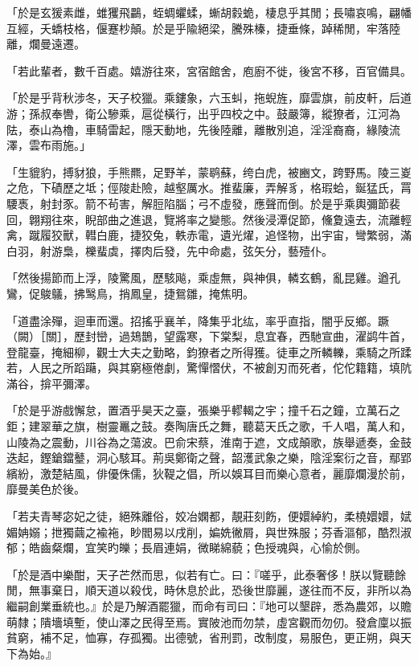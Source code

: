 \begin{pinyinscope}
「於是玄猨素雌，蜼玃飛鸓，蛭蜩蠷蝚，螹胡豰蛫，棲息乎其閒；長嘯哀鳴，翩幡互經，夭蟜枝格，偃蹇杪顛。於是乎隃絕梁，騰殊榛，捷垂條，踔稀閒，牢落陸離，爛曼遠遷。

「若此輩者，數千百處。嬉游往來，宮宿館舍，庖廚不徙，後宮不移，百官備具。

「於是乎背秋涉冬，天子校獵。乘鏤象，六玉虯，拖蜺旌，靡雲旗，前皮軒，后道游；孫叔奉轡，衛公驂乘，扈從橫行，出乎四校之中。鼓嚴簿，縱獠者，江河為阹，泰山為櫓，車騎雷起，隱天動地，先後陸離，離散別追，淫淫裔裔，緣陵流澤，雲布雨施。」

「生貔豹，搏豺狼，手熊羆，足野羊，蒙鹖蘇，绔白虎，被豳文，跨野馬。陵三嵏之危，下磧歷之坻；俓陖赴險，越壑厲水。推蜚廉，弄解豸，格瑕蛤，鋋猛氏，罥騕褭，射封豕。箭不茍害，解脰陷腦；弓不虛發，應聲而倒。於是乎乘輿彌節裴回，翺翔往來，睨部曲之進退，覽將率之變態。然後浸潭促節，儵夐遠去，流離輕禽，蹴履狡獸，轊白鹿，捷狡兔，軼赤電，遺光燿，追怪物，出宇宙，彎繁弱，滿白羽，射游梟，櫟蜚虡，擇肉后發，先中命處，弦矢分，藝殪仆。

「然後揚節而上浮，陵驚風，歷駭飚，乘虛無，與神俱，轔玄鶴，亂昆雞。遒孔鸞，促鵔鸃，拂鹥鳥，捎鳳皇，捷鴛雛，掩焦明。

「道盡涂殫，迴車而還。招搖乎襄羊，降集乎北纮，率乎直指，闇乎反鄉。蹶（闕）［關］，歷封巒，過鳷鵲，望露寒，下棠梨，息宜春，西馳宣曲，濯鹢牛首，登龍臺，掩細柳，觀士大夫之勤略，鈞獠者之所得獲。徒車之所轔轢，乘騎之所蹂若，人民之所蹈躤，與其窮極倦劇，驚憚慴伏，不被創刃而死者，佗佗籍籍，填阬滿谷，揜平彌澤。

「於是乎游戲懈怠，置酒乎昊天之臺，張樂乎轇輵之宇；撞千石之鐘，立萬石之鉅；建翠華之旗，樹靈鼉之鼓。奏陶唐氏之舞，聽葛天氏之歌，千人唱，萬人和，山陵為之震動，川谷為之蕩波。巴俞宋蔡，淮南于遮，文成顛歌，族舉遞奏，金鼓迭起，鏗鎗鐺鼞，洞心駭耳。荊吳鄭衛之聲，韶濩武象之樂，陰淫案衍之音，鄢郢繽紛，激楚結風，俳優侏儒，狄鞮之倡，所以娛耳目而樂心意者，麗靡爛漫於前，靡曼美色於後。

「若夫青琴宓妃之徒，絕殊離俗，姣冶嫻都，靚莊刻飭，便嬛綽約，柔橈嬛嬛，娬媚姌嫋；抴獨繭之褕袘，眇閻易以戌削，媥姺徶屑，與世殊服；芬香漚郁，酷烈淑郁；皓齒粲爛，宜笑旳皪；長眉連娟，微睇綿藐；色授魂與，心愉於側。

「於是酒中樂酣，天子芒然而思，似若有亡。曰：『嗟乎，此泰奢侈！朕以覽聽餘閒，無事棄日，順天道以殺伐，時休息於此，恐後世靡麗，遂往而不反，非所以為繼嗣創業垂統也。』於是乃解酒罷獵，而命有司曰：『地可以墾辟，悉為農郊，以贍萌隸；隤墻填塹，使山澤之民得至焉。實陂池而勿禁，虛宮觀而勿仞。發倉廩以振貧窮，補不足，恤寡，存孤獨。出德號，省刑罰，改制度，易服色，更正朔，與天下為始。』


\end{pinyinscope}
